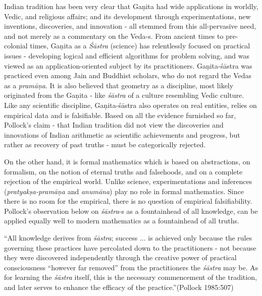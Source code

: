 Indian tradition has been very clear that Gaṇita had wide applications in worldly, Vedic, and religious affairs; and its development through experimentations, new inventions, discoveries, and innovation - all stemmed from this all-pervasive need, and not merely as a commentary on the Veda-s. From ancient times to pre-colonial times, Gaṇita as a {\sl Śāstra} (science) has relentlessly focused on practical issues - developing logical and efficient algorithms for problem solving, and was viewed as an application-oriented subject by its practitioners. Gaṇita-śāstra was practiced even among Jain and Buddhist scholars, who do not regard the Vedas as a {\sl pramāṇa}. It is also believed that geometry as a discipline, most likely originated from the Gaṇita - like {\sl śāstra} of a culture resembling Vedic culture. Like any scientific discipline, Gaṇita-śāstra also operates on real entities, relies on empirical data and is falsifiable. Based on all the evidence furnished so far, Pollock’s claim - that Indian tradition did not view the discoveries and innovations of Indian arithmetic as scientific achievements and progress, but rather as recovery of past truths - must be categorically rejected.

On the other hand, it is formal mathematics which is based on abstractions, on formalism, on the notion of eternal truths and falsehoods, and on a complete rejection of the empirical world. Unlike science, experimentations and inferences ({\sl pratyakṣa-pramāṇa} and {\sl anumāna}) play no role in formal mathematics. Since there is no room for the empirical, there is no question of empirical falsifiability. Pollock’s observation below on {\sl śāstra}-s as a fountainhead of all knowledge, can be applied equally well to modern mathematics as a fountainhead of all truths.
\begin{myquote}
``All knowledge derives from {\sl śāstra}; success ... is achieved only because the rules governing these practices have percolated down to the practitioners - not because they were discovered independently through the creative power of practical consciousness ``however far removed'' from the practitioners the {\sl śāstra} may be. As for learning the {\sl śāstra} itself, this is the necessary commencement of the tradition, and later serves to enhance the efficacy of the practice.''\hfill (Pollock 1985:507)
\end{myquote}

